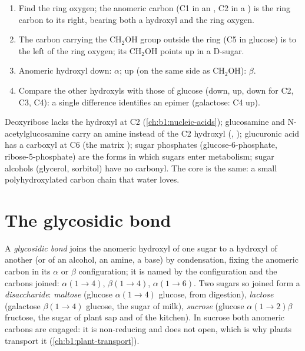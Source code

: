 \begin{method}\label{met:b1:carbohydrates:haworth}
\begin{enumerate}
  \item Find the ring oxygen; the anomeric carbon (C1 in an , C2
        in a ) is the ring carbon to its right, bearing both a
        hydroxyl and the ring oxygen.
  \item The carbon carrying the $\mathrm{CH_2OH}$ group outside the
        ring (C5 in glucose) is to the left of the ring oxygen; its
        $\mathrm{CH_2OH}$ points up in a D-sugar.
  \item Anomeric hydroxyl down: $\alpha$; up (on the same side as
        $\mathrm{CH_2OH}$): $\beta$.
  \item Compare the other hydroxyls with those of glucose (down, up,
        down for C2, C3, C4): a single difference identifies an epimer
        (galactose: C4 up).
\end{enumerate}
\end{method}

\begin{example}\label{ex:b1:carbohydrates:derivatives}
Deoxyribose lacks the hydroxyl at C2 (\cref{ch:b1:nucleic-acids});
glucosamine and N-acetylglucosamine carry an amine instead of the C2
hydroxyl (, ); glucuronic acid has a carboxyl at C6
(the matrix ); sugar phosphates (glucose-6-phosphate,
ribose-5-phosphate) are the forms in which sugars enter metabolism;
sugar alcohols (glycerol, sorbitol) have no carbonyl. The core is the
same: a small polyhydroxylated carbon chain that water loves.
\end{example}

\section{The glycosidic bond}

\begin{definition}\label{def:b1:carbohydrates:glycosidic}
A \emph{glycosidic bond} joins the anomeric
hydroxyl of one sugar to a hydroxyl of another (or of an alcohol, an
amine, a base) by condensation, fixing the anomeric carbon in its
$\alpha$ or $\beta$ configuration; it is named by the configuration and
the carbons joined: $\alpha(1{\to}4)$, $\beta(1{\to}4)$,
$\alpha(1{\to}6)$. Two sugars so joined form a
\emph{disaccharide}: \emph{maltose}
(glucose $\alpha(1{\to}4)$ glucose, from  digestion),
\emph{lactose} (galactose $\beta(1{\to}4)$ glucose, the sugar of milk),
\emph{sucrose} (glucose $\alpha(1{\to}2)\beta$ fructose, the sugar of
plant sap and of the kitchen). In sucrose both anomeric carbons are
engaged: it is non-reducing and does not open, which is why plants
transport it (\cref{ch:b1:plant-transport}).
\end{definition}

